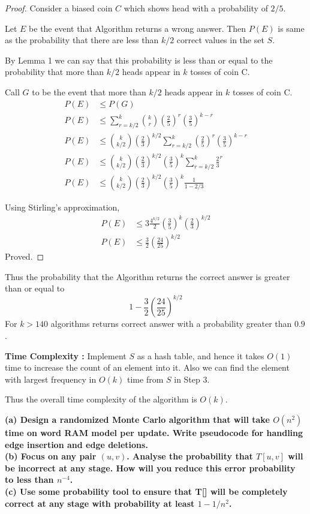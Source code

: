 \documentclass[a4paper]{article}
\begin{document}
\begin{proof}
Consider a biased coin $C$ which shows head with a probability of $2/5$.

Let $E$ be the event that Algorithm returns a wrong answer. Then $P(E)$ is same as the probability that there are less than $k/2$ correct values in the set $S$.

By Lemma 1 we can say that this probability is less than or equal to the probability that more than $k/2$ heads appear in $k$ tosses of coin C.

Call $G$ to be the event that more than $k/2$ heads appear in $k$ tosses of coin C.
\begin{align*}
P(E) & \leq P(G) \\
P(E) & \leq \sum_{r = k/2}^{k}\binom{k}{r}\left(\frac{2}{5}\right)^r\left(\frac{3}{5}\right)^{k-r} \\
P(E) & \leq \binom{k}{k/2}\left(\frac{2}{3}\right)^{k/2}\sum_{r = k/2}^{k}\left(\frac{2}{5}\right)^r\left(\frac{3}{5}\right)^{k-r} \\
P(E) & \leq \binom{k}{k/2}\left(\frac{2}{3}\right)^{k/2}\left(\frac{3}{5}\right)^k\sum_{r = k/2}^{k}{\frac{2}{3}}^r \\
P(E) & \leq \binom{k}{k/2}\left(\frac{2}{3}\right)^{k/2}\left(\frac{3}{5}\right)^k\frac{1}{1-2/3}
\end{align*}

Using Stirling's approximation,
\begin{align*}
P(E) & \leq 3\frac{4^{k/2}}{2}\left(\frac{3}{5}\right)^k\left(\frac{2}{3}\right)^{k/2} \\
P(E) & \leq \frac{3}{2}\left(\frac{24}{25}\right)^{k/2}
\end{align*}
Proved.
\end{proof}
Thus the probability that the Algorithm returns the correct answer is greater than or equal to $$1 - \frac{3}{2}\left(\frac{24}{25}\right)^{k/2}$$
For $k > 140$ algorithms returns correct answer with a probability greater than $0.9$.

\textbf{Time Complexity :} Implement $S$ as a hash table, and hence it takes $O(1)$ time to increase the count of an element into it. Also we can find the element with largest frequency in $O(k)$ time from $S$ in Step $3$.

Thus the overall time complexity of the algorithm is $O(k)$.

\pagebreak



\begin{question}[]
\textbf{(a) Design a randomized Monte Carlo algorithm that will take $O(n^2)$ time on word RAM model per
update. Write pseudocode for handling edge insertion and edge deletions.} \\
\textbf{(b) Focus on any pair $(u, v)$. Analyse the probability that $T[u, v]$ will be incorrect at any stage. How will you reduce this error probability to less than $n^{-4}$.} \\
\textbf{(c) Use some probability tool to ensure that T[] will be completely correct at any stage with probability at least $1 - 1/n^2$.}

\end{question}
\end{document}
